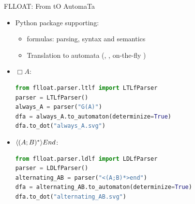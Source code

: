 \documentclass{beamer}
\begin{document}
\begin{frame}[fragile]{FLLOAT: From \LLf tO AutomaTa}

\begin{itemize}
	\item Python package supporting:
	\begin{itemize}
		\item \LLf formulas: parsing, syntax and semantics
		\item Translation to automata (\NFA, \DFA, on-the-fly \DFA)
	\end{itemize}

		\item $\Box A$:
\begin{lstlisting}[language=Python, style=Python, numbers=none]
from flloat.parser.ltlf import LTLfParser
parser = LTLfParser()
always_A = parser("G(A)")
dfa = always_A.to_automaton(determinize=True)
dfa.to_dot("always_A.svg")
\end{lstlisting}

			\item $\langle (A;B)^* \rangle End$:
\begin{lstlisting}[language=Python, style=Python, numbers=none]
from flloat.parser.ldlf import LDLfParser
parser = LDLfParser()
alternating_AB = parser("<(A;B)*>end")
dfa = alternating_AB.to_automaton(determinize=True)
dfa.to_dot("alternating_AB.svg")
\end{lstlisting}
	\end{itemize}

\end{frame}
\end{document}
